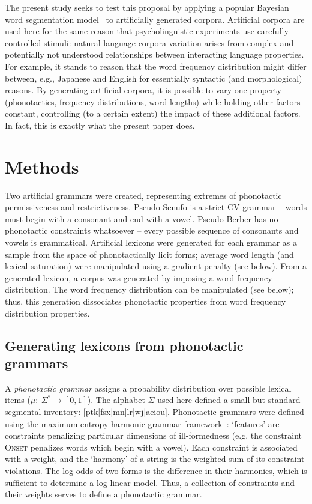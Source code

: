 \documentclass[11pt]{article}
\begin{document}
The present study seeks to test this proposal by applying a popular Bayesian word segmentation model~\cite{Brent99a,Goldwater07c,Goldwater09a} to artificially generated corpora. Artificial corpora are used here for the same reason that psycholinguistic experiments use carefully controlled stimuli: natural language corpora variation arises from complex and potentially not understood relationships between interacting language properties. For example, it stands to reason that the word frequency distribution might differ between, e.g., Japanese and English for essentially syntactic (and morphological) reasons. By generating artificial corpora, it is possible to vary one property (phonotactics, frequency distributions, word lengths) while holding other factors constant, controlling (to a certain extent) the impact of these additional factors. In fact, this is exactly what the present paper does.

\section{Methods}
\vspace*{-5pt}
Two artificial grammars were created, representing extremes of phonotactic permissiveness and restrictiveness. Pseudo-Senufo is a strict CV grammar -- words must begin with a consonant and end with a vowel.
Pseudo-Berber has no phonotactic constraints whatsoever -- every possible sequence of consonants and vowels is grammatical. Artificial lexicons were generated for each grammar as a sample from the space of phonotactically licit forms; average word length (and lexical saturation) were manipulated using a gradient penalty (see below). From a generated lexicon, a corpus was generated by imposing a word frequency distribution. The word frequency distribution can be manipulated (see below); thus, this generation dissociates phonotactic properties from word frequency distribution properties.
 
\subsection{Generating lexicons from phonotactic grammars}

A \textit{phonotactic grammar} assigns a probability distribution over possible lexical items ($\mu:~\Sigma^* \rightarrow[0,1]$). The alphabet $\Sigma$ used here defined a small but standard segmental inventory: [ptk|fsx|mn|lr|wj|aeiou]. Phonotactic grammars were defined using the maximum entropy harmonic grammar framework~\cite{Hayes08a}: `features' are constraints penalizing particular dimensions of ill-formedness (e.g. the constraint \textsc{Onset} penalizes words which begin with a vowel). Each constraint is associated with a weight, and the `harmony' of a string is the weighted sum of its constraint violations. The log-odds of two forms is the difference in their harmonies, which is sufficient to determine a log-linear model. Thus, a collection of constraints and their weights serves to define a phonotactic grammar.
\end{document}
